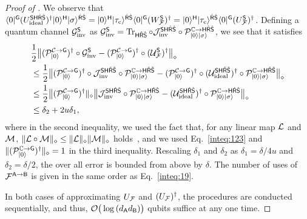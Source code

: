 \begin{proof}[Proof of ]
We observe that  $\bra{0}^\sG(U_{\rm ideal}^{\sS\sH\hat{\sR}\hat{\sS}})^\dag\ket{0}^{\sH}\ket{\sigma}^{\hat{\sR}\hat{\sS}} = \ket{0}^\sH\ket{\tau_{\rm c}}^{\hat{\sR}\hat{\sS}}\bra{0}^\sG(W_\cF^\sS)^\dag = \ket{0}^\sH\ket{\tau_{\rm c}}^{\hat{\sR}\hat{\sS}}\bra{0}^\sG (U_\cF^\sS)^\dag$.
Defining a quantum channel $\cG_{\rm inv}^\sS$ as $\cG_{\rm inv}^\sS = \tr_{\sH\hat{\sR}\hat{\sS}} \circ \cJ_{\rm inv}^{\sS\sH\hat{\sR}\hat{\sS}} \circ \cP_{\ket{0}\ket{\sigma}}^{\bC\rarr\sH\hat{\sR}\hat{\sS}}$, we see that it satisfies
\begin{align}
    &\f{1}{2}\big\|(\cP_{\ket{0}}^{\cC\rarr\sG})^\dag\circ\cG_{\rm inv}^\sS
    - (\cP_{\ket{0}}^{\cC\rarr\sG})^\dag\circ(\cU_\cF^\sS)^\dag\big\|_\diamond \\
    &\leq \f{1}{2}\big\|(\cP_{\ket{0}}^{\cC\rarr\sG})^\dag\circ \cJ_{\rm inv}^{\sS\sH\hat{\sR}\hat{\sS}}\circ\cP_{\ket{0}\ket{\sigma}}^{\bC\rarr\sH\hat{\sR}\hat{\sS}} - (\cP_{\ket{0}}^{\cC\rarr\sG})^\dag\circ(\cU_{\rm ideal}^{\sS\sH\hat{\sR}\hat{\sS}})^\dag\circ\cP_{\ket{0}\ket{\sigma}}^{\bC\rarr\sH\hat{\sR}\hat{\sS}}\big\|_\diamond \\
    &\leq \f{1}{2}\big\|(\cP_{\ket{0}}^{\cC\rarr\sG})^\dag\|_\diamond \big\|\cJ_{\rm inv}^{\sS\sH\hat{\sR}\hat{\sS}}\circ\cP_{\ket{0}\ket{\sigma}}^{\bC\rarr\sH\hat{\sR}\hat{\sS}} - (\cU_{\rm ideal}^{\sS\sH\hat{\sR}\hat{\sS}})^\dag\circ\cP_{\ket{0}\ket{\sigma}}^{\bC\rarr\sH\hat{\sR}\hat{\sS}}\big\|_\diamond \\
    &\leq \delta_2 + 2u\delta_1,
\end{align}
where in the second inequality, we used the fact that, for any linear map $\cL$ and $\cM$, $\|\cL\circ\cM\|_\diamond \leq \|\cL\|_\diamond\|\cM\|_\diamond$ holds~\cite{watrous2018TheoryQI}, and we used Eq.~\eqref{inteq:123} and $\|(\cP_{\ket{0}}^{\bC\rarr\sG})^\dag\|_\diamond = 1$ in the third inequality. 
Rescaling $\delta_1$ and $\delta_2$ as $\delta_1 = \delta/4u$ and $\delta_2 = \delta/2$, the over all error is bounded from above by $\delta$. 
The number of uses of $\cF^{\sA\rarr\sB}$ is given in the same order as Eq.~\eqref{inteq:19}.

In both cases of approximating $U_\cF$ and $(U_\cF)^\dag$, the procedures are conducted sequentially, and thus, $\cO\big(\log{(d_\sA d_\sB)}\big)$ qubits suffice at any one time.


\end{proof}


